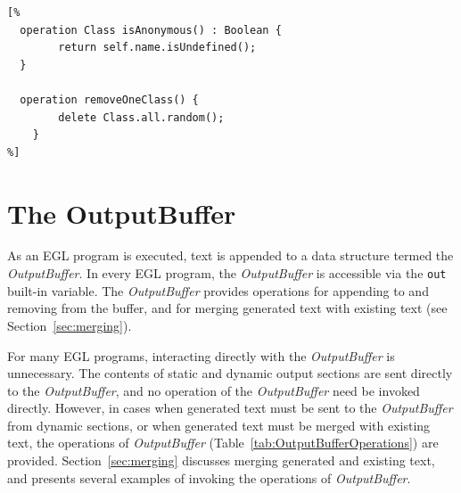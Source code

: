 \begin{lstlisting}[float=tbp, caption=Operations that do not generate any text., label=lst:egl_normal_operations, language=EGL]
[%
  operation Class isAnonymous() : Boolean {
		return self.name.isUndefined();
  }

  operation removeOneClass() {
		delete Class.all.random();
	}
%]
\end{lstlisting}

\section{The OutputBuffer}
As an EGL program is executed, text is appended to a data structure termed the \emph{OutputBuffer}. In every EGL program, the \emph{OutputBuffer} is accessible via the \texttt{out} built-in variable. The \emph{OutputBuffer} provides operations for appending to and removing from the buffer, and for merging generated text with existing text (see Section~\ref{sec:merging}).

For many EGL programs, interacting directly with the \emph{OutputBuffer} is unnecessary. The contents of static and dynamic output sections are sent directly to the \emph{OutputBuffer}, and no operation of the \emph{OutputBuffer} need be invoked directly. However, in cases when generated text must be sent to the \emph{OutputBuffer} from dynamic sections, or when generated text must be merged with existing text, the operations of \emph{OutputBuffer} (Table~\ref{tab:OutputBufferOperations}) are provided. Section~\ref{sec:merging} discusses merging generated and existing text, and presents several examples of invoking the operations of \emph{OutputBuffer}.

